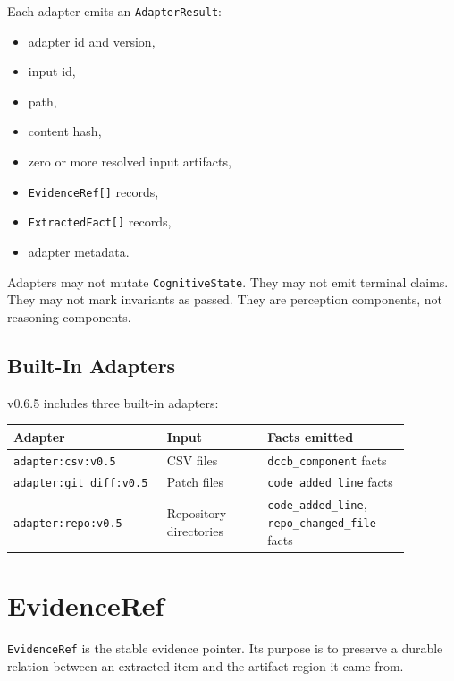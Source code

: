 \documentclass[11pt]{article}
\begin{document}
Each adapter emits an \texttt{AdapterResult}:

\begin{itemize}[leftmargin=1.5em]
  \item adapter id and version,
  \item input id,
  \item path,
  \item content hash,
  \item zero or more resolved input artifacts,
  \item \texttt{EvidenceRef[]} records,
  \item \texttt{ExtractedFact[]} records,
  \item adapter metadata.
\end{itemize}

Adapters may not mutate \texttt{CognitiveState}. They may not emit terminal claims. They may not mark invariants as passed. They are perception components, not reasoning components.

\subsection{Built-In Adapters}

v0.6.5 includes three built-in adapters:

\begin{center}
\begin{tabular}{p{0.3\linewidth}p{0.24\linewidth}p{0.34\linewidth}}
\toprule
\textbf{Adapter} & \textbf{Input} & \textbf{Facts emitted} \\
\midrule
\texttt{adapter:csv:v0.5} & CSV files & \texttt{dccb\_component} facts \\
\texttt{adapter:git\_diff:v0.5} & Patch files & \texttt{code\_added\_line} facts \\
\texttt{adapter:repo:v0.5} & Repository directories & \texttt{code\_added\_line}, \texttt{repo\_changed\_file} facts \\
\bottomrule
\end{tabular}
\end{center}

\section{EvidenceRef}

\texttt{EvidenceRef} is the stable evidence pointer. Its purpose is to preserve a durable relation between an extracted item and the artifact region it came from.
\end{document}
